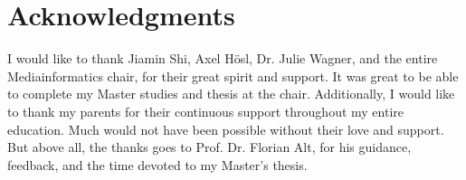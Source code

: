 
\section*{Acknowledgments}

I would like to thank Jiamin Shi, Axel H{\"o}sl, Dr. Julie Wagner, and the entire Mediainformatics chair, for their great spirit and support. It was great to be able to complete my Master studies and thesis at the chair. Additionally, I would like to thank my parents for their continuous support throughout my entire education. Much would not have been possible without their love and support. But above all, the thanks goes to Prof. Dr. Florian Alt, for his guidance, feedback, and the time devoted to my Master's thesis.
